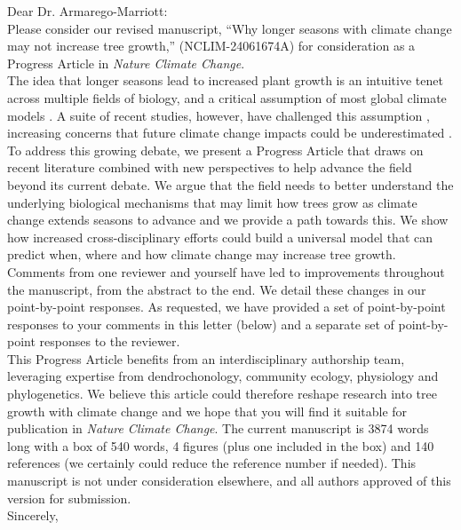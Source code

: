 \documentclass[11pt,a4paper]{article}
\begin{document}
\noindent Dear Dr. Armarego-Marriott:
\vspace{1.5ex}\\
Please consider our revised manuscript, ``Why longer seasons with climate change may not increase tree growth,'' (NCLIM-24061674A) for consideration as a Progress Article in \emph{Nature Climate Change}. 
\vspace{1.5ex}\\
The idea that longer seasons lead to increased plant growth is an intuitive tenet across multiple fields of biology, and a critical assumption of most global climate models \citep{friedlingstein2022global}. A suite of recent studies, however, have challenged this assumption \citep[e.g.][]{dow2022warm,green2022limits}, increasing concerns that future climate change impacts could be underestimated \citep{green2022limits,korner2023four}. 
\vspace{1.5ex}\\
To address this growing debate, we present a Progress Article that draws on recent literature combined with new perspectives to help advance the field beyond its current debate. We argue that the field needs to better understand the underlying biological mechanisms that may limit how trees grow as climate change extends seasons to advance and we provide a path towards this.  We show how increased cross-disciplinary efforts could build a universal model that can predict when, where and how climate change may increase tree growth. 
\vspace{1.5ex}\\
Comments from one reviewer and yourself have led to improvements throughout the manuscript, from the abstract to the end. We detail these changes in our point-by-point responses. As requested, we have provided a set of point-by-point responses to your comments in this letter (below) and a separate set of point-by-point responses to the reviewer. %
\vspace{1.5ex}\\
This Progress Article benefits from an interdisciplinary authorship team, leveraging expertise from dendrochonology, community ecology, physiology and phylogenetics. We believe this article could therefore reshape research into tree growth with climate change and we hope that you will find it suitable for publication in \emph{Nature Climate Change}. The current manuscript is 3874 words long with a box of 540 words, 4 figures (plus one included in the box) and 140 references (we certainly could reduce the reference number if needed). This manuscript is not under consideration elsewhere, and all authors approved of this version for submission. 
\vspace{1.5ex}\\
Sincerely,\\
\end{document}
